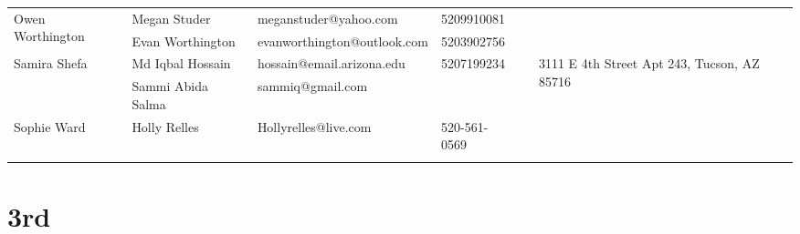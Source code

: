 \documentclass[landscape]{article}\usepackage[]{graphicx}\usepackage[]{color}
\begin{document}
\begin{longtable}{|p{100pt}|p{100pt}|p{140pt}|p{60pt}|p{64pt}|p{120pt}|}
\hline
\multirow{2}{100pt}{Owen Worthington} & Megan Studer & meganstuder@yahoo.com & 5209910081 &  & \multirow{2}{120pt}{} \\
 & Evan Worthington & evanworthington@outlook.com & 5203902756 &  & \\
\hline
\multirow{2}{100pt}{Samira Shefa} & Md Iqbal Hossain & hossain@email.arizona.edu & 5207199234 &  & \multirow{2}{120pt}{3111 E 4th Street Apt 243, Tucson, AZ 85716} \\
 & Sammi Abida Salma & sammiq@gmail.com &  &  & \\
\hline
\multirow{2}{100pt}{Sophie Ward} & Holly Relles & Hollyrelles@live.com & 520-561-0569 &  & \multirow{2}{120pt}{} \\
 &  &  &  &  & \\
\hline
\end{longtable}
\newpage
\section{3rd}
\end{document}
